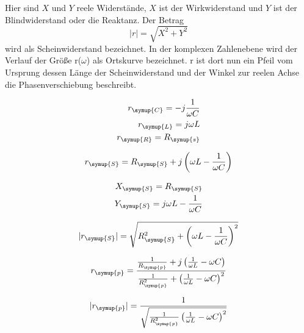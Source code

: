     Hier sind $X$ und $Y$ reele Widerstände, $X$ ist  der Wirkwiderstand und $Y$ ist der Blindwiderstand oder die Reaktanz. Der Betrag
    \begin{equation}
        |r| = \sqrt{X^2 + Y^2} \nonumber
    \end{equation}
    wird als Scheinwiderstand bezeichnet. In der komplexen Zahlenebene wird der Verlauf der Größe r($\omega$) als Ortskurve bezeichnet. 
    r ist dort nun ein Pfeil vom Ursprung dessen Länge der Scheinwiderstand und der Winkel zur reelen Achse die Phasenverschiebung 
    beschreibt.

    \begin{align}
        r_{\symup{C}} = -j\frac{1}{\omega C} \nonumber\\
        r_{\symup{L}} = j\omega L  \nonumber\\
        r_{\symup{R}} = R_{\symup{s}} \nonumber
    \end{align}

    \begin{equation}
        r_{\symup{S}} = R_{\symup{S}} + j \left(    \omega L - \frac{1}{\omega C} \right) \nonumber
    \end{equation}

    \begin{align}
        X_{\symup{S}} = R_{\symup{S}}  \nonumber\\ 
        Y_{\symup{S}} = j \omega L - \frac{1}{\omega C} \nonumber
    \end{align}

    \begin{equation}
        |r_{\symup{S}}| = \sqrt{R^2_{\symup{S}} + \left( \omega L - \frac{1}{\omega C} \right)^2} \nonumber
    \end{equation}

    \begin{equation}
        r_{\symup{p}} = \frac{\frac{1}{R_{\symup{p}}}+j \left( \frac{1}{\omega L} - \omega C \right)}{\frac{1}{R^2_{\symup{p}}}+ \left( \frac{1}{\omega L} - \omega C \right)^2} \nonumber
    \end{equation}

    \begin{equation}
        |r_{\symup{p}}|=  \frac{1}{\sqrt{\frac{1}{R^2_{\symup{p}}} \left( \frac{1}{\omega L} - \omega C \right)^2}} \nonumber
    \end{equation}
